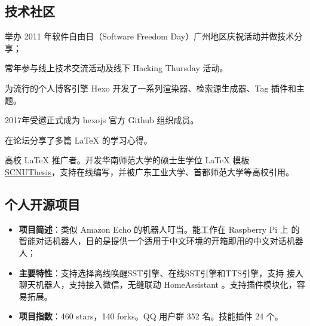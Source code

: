 \documentclass[11pt,a4paper,nolmodern]{moderncv}
\begin{document}
\newpage

\subsection{\hei 技术社区}

{
  \begin{tightitemize}%
  \item 举办 2011 年软件自由日（Software Freedom Day）广州地区庆祝活动并做技术分享；
  \item 常年参与线上技术交流活动及线下 Hacking Thursday 活动。
  \end{tightitemize}}

{
  \begin{tightitemize}%
  \item 为流行的个人博客引擎 Hexo 开发了一系列渲染器、检索源生成器、Tag 插件和主
    题。
  \item 2017年受邀正式成为 hexojs 官方 Github 组织成员。
  \end{tightitemize}}

{
  \begin{tightitemize}%
  \item 在论坛分享了多篇 \LaTeX{} 的学习心得。
  \item 高校 \LaTeX{} 推广者。开发华南师范大学的硕士生学位 \LaTeX{} 模板
    \href{https://github.com/scnu/scnuthesis}{SCNUThesis}，支持在线编写，并被广东工业大学、首都师范大学等高校引用。
  \end{tightitemize}}

\subsection{\hei 个人开源项目}

%
  {
\begin{itemize}
\item \textbf{项目简述}：类似 Amazon Echo 的机器人叮当。能工作在 Raspberry Pi 上
  的智能对话机器人，目的是提供一个适用于中文环境的开箱即用的中文对话机器人；
\item \textbf{主要特性}：支持选择离线唤醒SST引擎、在线SST引擎和TTS引擎，支持
  接入聊天机器人，支持接入微信，无缝联动 HomeAssistant 。支持插件模块化，容易拓展。
\item \textbf{项目指数}：460 stars，140 forks。QQ 用户群 352 名。技能插件 24 个。
\end{itemize}}
\end{document}
